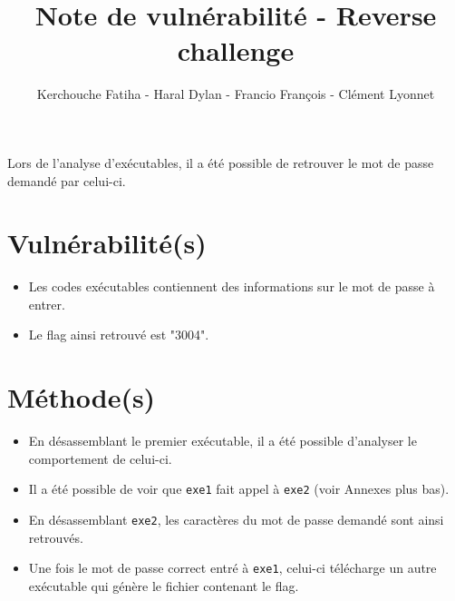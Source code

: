 \documentclass[12pt]{article}
\begin{document}
  \title{Note de vulnérabilité - Reverse challenge}
  \author{Kerchouche Fatiha - Haral Dylan - Francio François - Clément Lyonnet}
  \date{}
  \maketitle

  Lors de l'analyse d'exécutables, il a été possible de retrouver le mot de passe demandé par celui-ci.

  \section{Vulnérabilité(s)}
  \begin{itemize}
    \item Les codes exécutables contiennent des informations sur le mot de passe à entrer.
    \item Le flag ainsi retrouvé est "3004".
  \end{itemize}

  \section{Méthode(s)}
  \begin{itemize}
    \item En désassemblant le premier exécutable, il a été possible d'analyser le comportement de celui-ci.
    \item Il a été possible de voir que \texttt{exe1} fait appel à \texttt{exe2} (voir Annexes plus bas).
    \item En désassemblant \texttt{exe2}, les caractères du mot de passe demandé sont ainsi retrouvés.
    \item Une fois le mot de passe correct entré à \texttt{exe1}, celui-ci télécharge un autre exécutable qui génère le fichier contenant le flag.
  \end{itemize}

  \newpage
\end{document}
